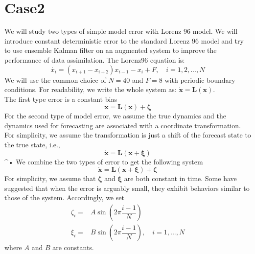 \documentclass{report}
\begin{document}
\section*{Case2}
We will study two types of simple model error with Lorenz 96 model. We will introduce constant deterministic error to the standard Lorenz 96 model and try to use ensemble Kalman filter on an augmented system to improve the performance of data assimilation.
The Lorenz96 equation is:
\begin{equation}
\dot{x_i}=(x_{i+1}-x_{i+2})x_{i-1}-x_{i}+F,\quad i=1,2,...,N
\end{equation}
We will use the common choice of $N=40$ and $F=8$ with periodic boundary conditions. For readability, we write the whole system as:
$\pmb{\dot{x}}=\mathbf{L(x)}$.\\
The first type error is a constant bias
\begin{equation*}
\dot{\pmb{x}}=\pmb{L}(\pmb{x})+\pmb{\zeta}
\end{equation*}
For the second type of model error, we assume the true dynamics and the dynamics used for forecasting are associated with a coordinate transformation. For simplicity, we assume the transformation is just a shift of the forecast state to the true state, i.e.,  
\begin{equation*}
\dot{\pmb{x}}=\pmb{L}(\pmb{x}+\pmb{\xi})
\end{equation*}^{•}
We combine the two types of error to get the following system
\begin{equation*}
\dot{\pmb{x}}=\pmb{L}(\pmb{x}+\pmb{\xi})+\pmb{\zeta}
\end{equation*}
For simplicity, we assume that $\pmb{\zeta}$ and $\pmb{\xi}$ are both constant in time. Some have suggested that when the error is arguably small, they exhibit behaviors similar to those of the system. Accordingly, we set
\begin{align*}
\zeta_i=&A\sin(2\pi\dfrac{i-1}{N})\\
\xi_i=&B\sin(2\pi\dfrac{i-1}{N}),\quad i=1,...,N
\end{align*}
where $A$ and $B$ are constants.
\end{document}
